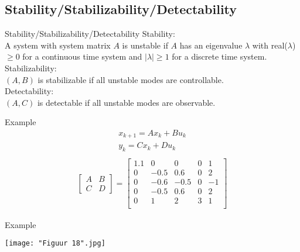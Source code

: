 \subsection{Stability/Stabilizability/Detectability}
\begin{frame}{Stability/Stabilizability/Detectability}
Stability:\\
A system with system matrix $A$ is unstable if $A$ has an
eigenvalue $\lambda$ with real($\lambda$)$\geq0$ for a continuous time system
and $|\lambda|\geq 1$ for a discrete time system.\\
\vspace{0.5cm}
Stabilizability:\\
$(A,B)$ is stabilizable if all unstable modes are controllable.\\
\vspace{0.5cm}
Detectability:\\
$(A,C)$ is detectable if all unstable modes are observable.
\end{frame}

\begin{frame}{Example}
\vspace{-1cm}
\begin{align*}
x_{k+1}=Ax_k+Bu_k\\
y_k=Cx_k+Du_k\\
\end{align*}
\vspace{-1cm}
\begin{align*}
{
\left[
    \begin{array}{c|c}
        A & B \\ \hline
        C & D
    \end{array}
\right]
=
\left[
\begin{array}{cccc|c}
1.1 & 0 &0&0&1 \\ 
0 & -0.5 &0.6&0&2\\ 
0 & -0.6 &-0.5&0&-1 \\
0 & -0.5 &0.6&0&2 \\\hline
0 & 1 &2&3&1 \\
\end{array}\right]
}
\end{align*}
\end{frame}

\begin{frame}{Example}
\begin{center}
    \texttt{[image: "Figuur 18".jpg]}
\end{center}
\end{frame}

